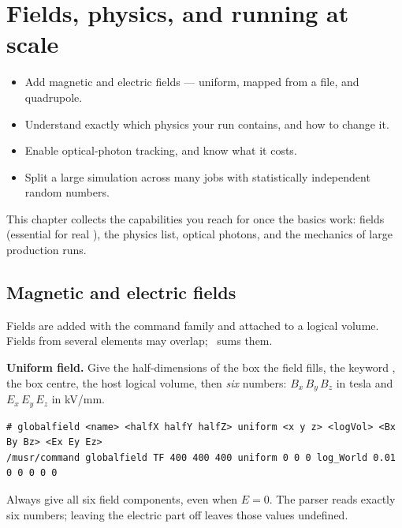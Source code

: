 \chapter{Fields, physics, and running at scale}
\label{ch:fields}

\begin{willdo}
\begin{itemize}
  \item Add magnetic and electric fields --- uniform, mapped from a file, and quadrupole.
  \item Understand exactly which physics your run contains, and how to change it.
  \item Enable optical-photon tracking, and know what it costs.
  \item Split a large simulation across many jobs with statistically independent random numbers.
\end{itemize}
\end{willdo}

This chapter collects the capabilities you reach for once the basics work: fields (essential for real \muSR), the physics list, optical photons, and the mechanics of large production runs.

\section{Magnetic and electric fields}
Fields are added with the  command family and attached to a logical volume. Fields from several elements may overlap; \musrSim\ sums them.

\textbf{Uniform field.} Give the half-dimensions of the box the field fills, the keyword , the box centre, the host logical volume, then \emph{six} numbers: \(B_x\,B_y\,B_z\) in tesla and \(E_x\,E_y\,E_z\) in kV/mm.

\begin{lstlisting}[style=mac,caption={A uniform \SI{10}{mT} field along $x$, over a \SI{800}{mm} cube at the origin}]
# globalfield <name> <halfX halfY halfZ> uniform <x y z> <logVol> <Bx By Bz> <Ex Ey Ez>
/musr/command globalfield TF 400 400 400 uniform 0 0 0 log_World 0.01 0 0 0 0 0
\end{lstlisting}

\begin{pitfall}
Always give all six field components, even when \(E=0\). The parser reads exactly six numbers; leaving the electric part off leaves those values undefined.
\end{pitfall}

